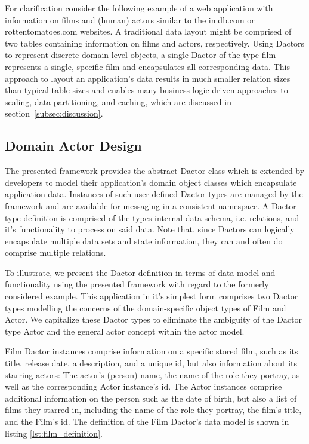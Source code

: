 For clarification consider the following example of a web application with information on films and (human) actors similar to the imdb.com or rottentomatoes.com websites.
A traditional data layout might be comprised of two tables containing information on films and actors, respectively.
Using Dactors to represent discrete domain-level objects, a single Dactor of the type film represents a single, specific film and encapsulates all corresponding data.
This approach to layout an application's data results in much smaller relation sizes than typical table sizes and enables many business-logic-driven approaches to scaling, data partitioning, and caching, which are discussed in section~\ref{subsec:discussion}.

\subsection{Domain Actor Design}\label{subsec:domain_actor_design}

The presented framework provides the abstract Dactor class which is extended by developers to model their application's domain object classes which encapsulate application data.
Instances of such user-defined Dactor types are managed by the framework and are available for messaging in a consistent namespace.
A Dactor type definition is comprised of the types internal data schema, i.e. relations, and it's functionality to process on said data.
Note that, since Dactors can logically encapsulate multiple data sets and state information, they can and often do comprise multiple relations.

To illustrate, we present the Dactor definition in terms of data model and functionality using the presented framework with regard to the formerly considered example.
This application in it's simplest form comprises two Dactor types modelling the concerns of the domain-specific object types of Film and Actor.
We capitalize these Dactor types to eliminate the ambiguity of the Dactor type Actor and the general actor concept within the actor model.

Film Dactor instances comprise information on a specific stored film, such as its title, release date, a description, and a unique id, but also information about its starring actors:
The actor's (person) name, the name of the role they portray, as well as the corresponding Actor instance's id.
The Actor instances comprise additional information on the person such as the date of birth, but also a list of films they starred in, including the name of the role they portray, the film's title, and the Film's id.
The definition of the Film Dactor's data model is shown in listing \ref{lst:film_definition}.

